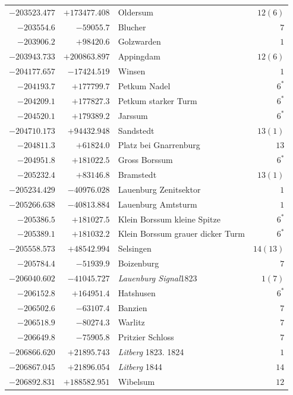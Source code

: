 \begin{center}
\begin{tabular}{r|r|p{170pt}|r}
\(-203523.477\)&\(+173477.408\)&Oldersum&\(12 (6)\)\\
\(-203554.6\)&\(-59055.7\)&Blucher&\(7\)\\
\(-203906.2\)&\(+98420.6\)&Golzwarden&\(1\)\\
\(-203943.733\)&\(+200863.897\)&Appingdam&\(12 (6)\)\\
\(-204177.657\)&\(-17424.519\)&Winsen&\(1\)\\
\(-204193.7\)&\(+177799.7\)&Petkum Nadel&\(6^{*}\)\\
\(-204209.1\)&\(+177827.3\)&Petkum starker Turm&\(6^{*}\)\\
\(-204520.1\)&\(+179389.2\)&Jarssum&\(6^{*}\)\\
\(-204710.173\)&\(+94432.948\)&Sandstedt&\(13 (1)\)\\
\(-204811.3\)&\(+61824.0\)&Platz bei Gnarrenburg&\(13\)\\
\(-204951.8\)&\(+181022.5\)&Gross Borssum&\(6^{*}\)\\
\(-205232.4\)&\(+83146.8\)&Bramstedt&\(13 (1)\)\\
\(-205234.429\)&\(-40976.028\)&Lauenburg Zenitsektor&\(1\)\\
\(-205266.638\)&\(-40813.884\)&Lauenburg Amtsturm&\(1\)\\
\(-205386.5\)&\(+181027.5\)&Klein Borssum kleine Spitze&\(6^{*}\)\\
\(-205389.1\)&\(+181032.2\)&Klein Borssum grauer dicker Turm&\(6^{*}\)\\
\(-205558.573\)&\(+48542.994\)&Selsingen&\(14(13)\)\\
\(-205784.4\)&\(-51939.9\)&Boizenburg&\(7\)\\
\(-206040.602\)&\(-41045.727\)&\textit{Lauenburg Signal}1823&\(1 (7)\)\\
\(-206152.8\)&\(+164951.4\)&Hatshusen&\(6^{*}\)\\
\(-206502.6\)&\(-63107.4\)&Banzien&\(7\)\\
\(-206518.9\)&\(-80274.3\)&Warlitz&\(7\)\\
\(-206649.8\)&\(-75905.8\)&Pritzier Schloss&\(7\)\\
\(-206866.620\)&\(+21895.743\)&\textit{Litberg} 1823. 1824&\(1\)\\
\(-206867.045\)&\(+21896.054\)&\textit{Litberg} 1844&\(14\)\\
\(-206892.831\)&\(+188582.951\)&Wibelsum&\(12\)\\
\hline\end{tabular}\endgroup\end{center}
\clearpage
